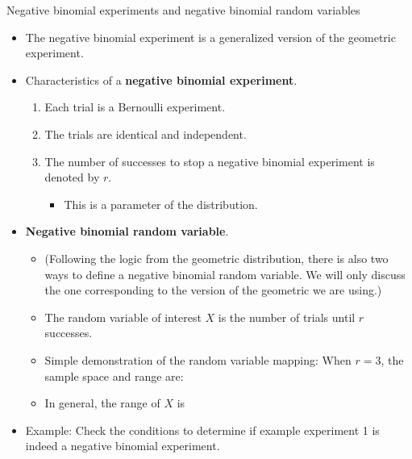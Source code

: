 \documentclass{article}
\begin{document}
Negative binomial experiments and negative binomial random variables\bigskip
\begin{itemize}
    \item The negative binomial experiment is a generalized version of the geometric experiment.
    \item Characteristics of a \textbf{negative binomial experiment}.\smallskip
    \begin{enumerate}
        \item Each trial is a Bernoulli experiment.
        \item The trials are identical and independent.
        \item The number of successes to stop a negative binomial experiment is denoted by $r$.
        \begin{itemize}
            \item This is a parameter of the distribution.
        \end{itemize}
    \end{enumerate}\smallskip
    \item \textbf{Negative binomial random variable}.
    \begin{itemize}
        \item[] (Following the logic from the geometric distribution, there is also two ways to define a negative binomial random variable. We will only discuss the one corresponding to the version of the geometric we are using.)\smallskip
        \item The random variable of interest $X$ is the number of trials until $r$ successes.
        \item Simple demonstration of the random variable mapping: When $r = 3$, the sample space and range are:\vspace{50pt}
        \item In general, the range of $X$ is\vspace{15pt}
    \end{itemize}
    \item Example: Check the conditions to determine if example experiment 1 is indeed a negative binomial experiment.\vspace{30pt}
\end{itemize}\bigskip
\end{document}
